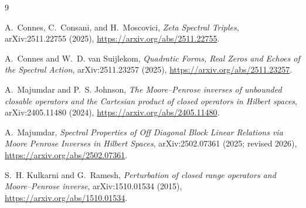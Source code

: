 \documentclass[11pt]{article}
\theoremstyle{definition}
\theoremstyle{remark}
\begin{document}
\begin{thebibliography}{9}

A.~Connes, C.~Consani, and H.~Moscovici,
\emph{Zeta Spectral Triples}, arXiv:2511.22755 (2025),
\url{https://arxiv.org/abs/2511.22755}.

A.~Connes and W.~D. van Suijlekom,
\emph{Quadratic Forms, Real Zeros and Echoes of the Spectral Action},
arXiv:2511.23257 (2025),
\url{https://arxiv.org/abs/2511.23257}.

A.~Majumdar and P.~S. Johnson,
\emph{The Moore--Penrose inverses of unbounded closable operators and the Cartesian product of
closed operators in Hilbert spaces}, arXiv:2405.11480 (2024),
\url{https://arxiv.org/abs/2405.11480}.

A.~Majumdar,
\emph{Spectral Properties of Off Diagonal Block Linear Relations via Moore Penrose Inverses in
Hilbert Spaces}, arXiv:2502.07361 (2025; revised 2026),
\url{https://arxiv.org/abs/2502.07361}.

S.~H. Kulkarni and G.~Ramesh,
\emph{Perturbation of closed range operators and Moore--Penrose inverse},
arXiv:1510.01534 (2015),
\url{https://arxiv.org/abs/1510.01534}.

\end{thebibliography}
\end{document}
